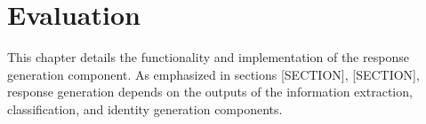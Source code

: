 \chapter{Evaluation}

This chapter details the functionality and implementation of the response generation component. As emphasized in sections [SECTION], [SECTION], response generation depends on the outputs of the information extraction, classification, and identity generation components. 

